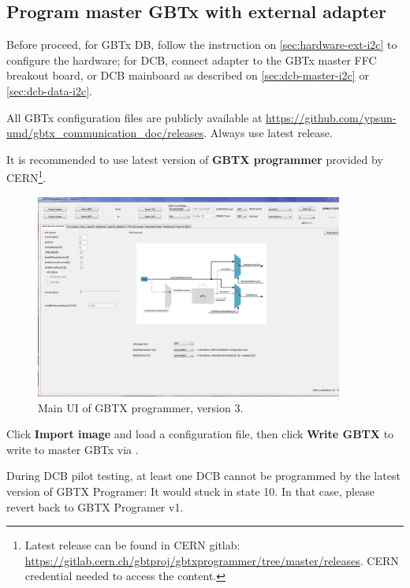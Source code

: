 \subsection{Program master GBTx with external \itwoc adapter}
Before proceed, for GBTx DB, follow the instruction on
\autoref{sec:hardware-ext-i2c} to configure the hardware;
for DCB, connect \itwoc adapter to the GBTx master FFC breakout board, or DCB
mainboard as described on \autoref{sec:dcb-master-i2c} or
\autoref{sec:dcb-data-i2c}.

All GBTx configuration files are publicly available at
\url{https://github.com/ypsun-umd/gbtx_communication_doc/releases}.
Always use latest release.

It is recommended to use latest version of \textbf{GBTX programmer} provided by
CERN\footnote{
    Latest release can be found in CERN gitlab:
    \url{https://gitlab.cern.ch/gbtproj/gbtxprogrammer/tree/master/releases}.
    CERN credential needed to access the content.
}.

\begin{figure}[!ht]
    \centering
    \includegraphics[width=0.9\textwidth]{res/gbtx_programmer_v3_ui.png}
    \caption{Main UI of GBTX programmer, version 3.}
    \label{fig:gbtx-programmer-ui}
\end{figure}

Click \textbf{Import image} and load a configuration file, then click
\textbf{Write GBTX} to write to master GBTx via \itwoc.

\begin{leftbar}
    During DCB pilot testing, at least one DCB cannot be programmed by the
    latest version of GBTX Programer: It would stuck in state 10.
    In that case, please revert back to GBTX Programer v1.
\end{leftbar}

